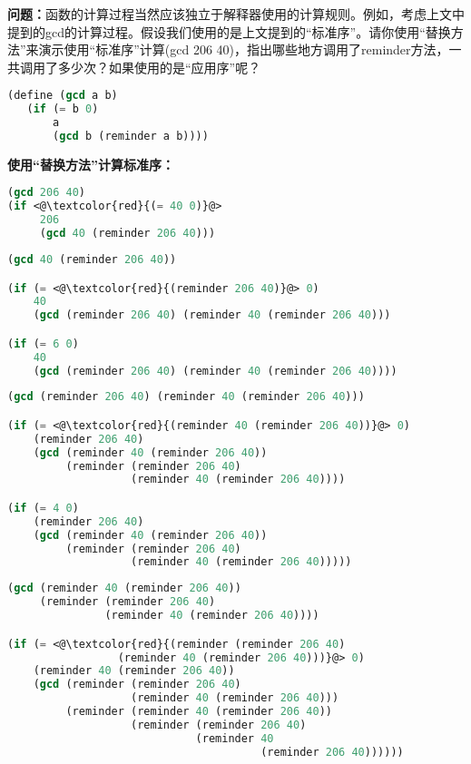 \documentclass[11pt, a4paper]{article}
\begin{document}
\begin{CJK}{UTF8}{gkai}
\textbf{问题：}函数的计算过程当然应该独立于解释器使用的计算规则。例如，考虑上文中提到的gcd的计算过程。假设我们使用的是上文提到的“标准序”。请你使用“替换方法”来演示使用“标准序”计算(gcd 206 40)，指出哪些地方调用了reminder方法，一共调用了多少次？如果使用的是“应用序”呢？

\begin{lstlisting}[language=Lisp, caption=definination of GCD]
(define (gcd a b)
   (if (= b 0)
       a
       (gcd b (reminder a b))))
\end{lstlisting}

\noindent\textbf{使用“替换方法”计算标准序：}
\begin{lstlisting}[language=Lisp, caption=Zero]
(gcd 206 40)
(if <@\textcolor{red}{(= 40 0)}@>
     206
     (gcd 40 (reminder 206 40)))
\end{lstlisting}

\begin{lstlisting}[language=Lisp, caption=Once]
(gcd 40 (reminder 206 40))

(if (= <@\textcolor{red}{(reminder 206 40)}@> 0) 
    40
    (gcd (reminder 206 40) (reminder 40 (reminder 206 40)))

(if (= 6 0)
    40
    (gcd (reminder 206 40) (reminder 40 (reminder 206 40))))
\end{lstlisting}

\begin{lstlisting}[language=Lisp, caption=Twice]
(gcd (reminder 206 40) (reminder 40 (reminder 206 40)))

(if (= <@\textcolor{red}{(reminder 40 (reminder 206 40))}@> 0) 
    (reminder 206 40)
    (gcd (reminder 40 (reminder 206 40)) 
         (reminder (reminder 206 40) 
                   (reminder 40 (reminder 206 40))))

(if (= 4 0)
    (reminder 206 40)
    (gcd (reminder 40 (reminder 206 40)) 
         (reminder (reminder 206 40) 
                   (reminder 40 (reminder 206 40)))))
\end{lstlisting}

\begin{lstlisting}[language=Lisp, caption=Four times]
(gcd (reminder 40 (reminder 206 40)) 
     (reminder (reminder 206 40) 
               (reminder 40 (reminder 206 40)))) 

(if (= <@\textcolor{red}{(reminder (reminder 206 40) 
                 (reminder 40 (reminder 206 40)))}@> 0)
    (reminder 40 (reminder 206 40))
    (gcd (reminder (reminder 206 40) 
                   (reminder 40 (reminder 206 40))) 
         (reminder (reminder 40 (reminder 206 40)) 
                   (reminder (reminder 206 40) 
                             (reminder 40 
                                       (reminder 206 40))))))


\end{lstlisting}
\end{CJK}
\end{document}
